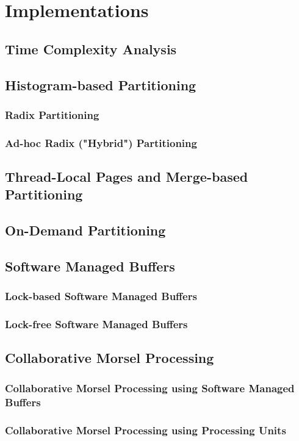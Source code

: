 
\chapter{Implementations}\label{chapter:implementations}

\section{Time Complexity Analysis}

\section{Histogram-based Partitioning}
\subsection{Radix Partitioning}
\subsection{Ad-hoc Radix ("Hybrid") Partitioning}

\section{Thread-Local Pages and Merge-based Partitioning}

\section{On-Demand Partitioning}

\section{Software Managed Buffers}
\subsection{Lock-based Software Managed Buffers}
\subsection{Lock-free Software Managed Buffers}

\section{Collaborative Morsel Processing}
\subsection{Collaborative Morsel Processing using Software Managed Buffers}
\subsection{Collaborative Morsel Processing using Processing Units}
